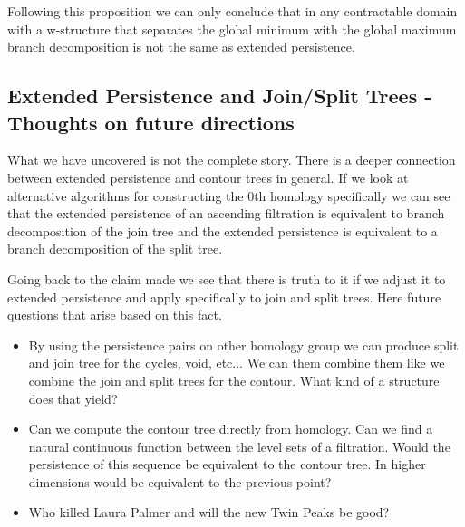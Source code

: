Following this proposition we can only conclude that in any contractable domain with a w-structure that separates the global minimum with the global maximum branch decomposition is not the same as extended persistence.

\subsection{Extended Persistence and Join/Split Trees - Thoughts on future directions}

What we have uncovered is not the complete story. There is a deeper connection between extended persistence and contour trees in general. If we look at alternative algorithms for constructing the 0th homology specifically we can see that the extended persistence of an ascending filtration is equivalent to branch decomposition of the join tree and the extended persistence is equivalent to a branch decomposition of the split tree.

Going back to the claim made \cite{ct-branch-decomp} we see that there is truth to it if we adjust it to extended persistence and apply specifically to join and split trees. Here future questions that arise based on this fact.

\begin{itemize}
    \item By using the persistence pairs on other homology group we can produce split and join tree for the cycles, void, etc... We can them combine them like we combine the join and split trees for the contour. What kind of a structure does that yield?
    \item Can we compute the contour tree directly from homology. Can we find a natural continuous function between the level sets of a filtration. Would the persistence of this sequence be equivalent to the contour tree. In higher dimensions would be equivalent to the previous point?
    \item Who killed Laura Palmer and will the new Twin Peaks be good?
\end{itemize}












